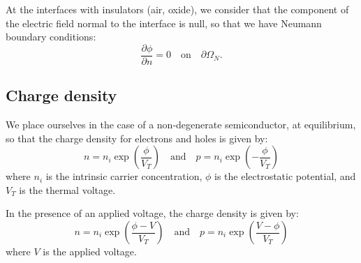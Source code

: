 \documentclass[]{article}
\begin{document}
At the interfaces with insulators (air, oxide), we consider that the component of the electric field normal to the interface is null, so that we have Neumann boundary conditions:
\begin{equation}
\label{eq:poisson4}
\frac{\partial \phi}{\partial n} = 0 \quad \text{on} \quad \partial \Omega_N.
\end{equation}

\subsection{Charge density}
We place ourselves in the case of a non-degenerate semiconductor, at equilibrium, so that the charge density for electrons and holes is given by:
\begin{equation}
\label{eq:charge_density}
n = n_i \exp \left( \frac{\phi}{V_T} \right) \quad \text{and} \quad p = n_i \exp \left( - \frac{\phi}{V_T} \right)
\end{equation}
where $n_i$ is the intrinsic carrier concentration, $\phi$ is the electrostatic potential, and $V_T$ is the thermal voltage.

In the presence of an applied voltage, the charge density is given by:
\begin{equation}
\label{eq:charge_density2}
n = n_i \exp \left( \frac{\phi - V}{V_T} \right) \quad \text{and} \quad p = n_i \exp \left( \frac{V - \phi}{V_T} \right)
\end{equation}
where $V$ is the applied voltage.
\end{document}
